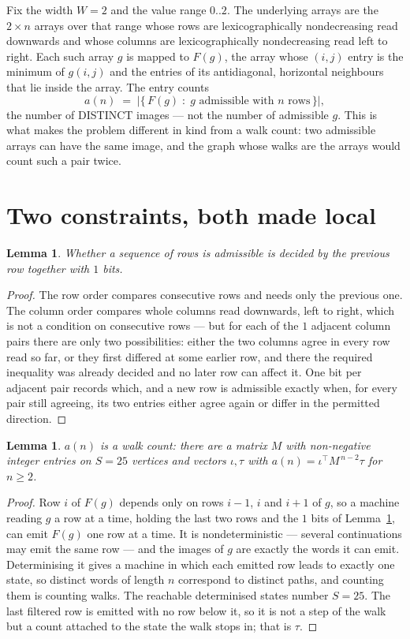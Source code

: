 \documentclass[11pt,a4paper]{article}
\theoremstyle{plain}
\newtheorem{lemma}[theorem]{Lemma}
\theoremstyle{definition}
\begin{document}
Fix the width $W=2$ and the value range $0..2$. The underlying arrays are the
$2\times n$ arrays over that range whose rows are lexicographically nondecreasing read downwards
and whose columns are lexicographically nondecreasing read left to right. Each such array $g$
is mapped to $F(g)$, the array whose $(i,j)$ entry is the minimum of $g(i,j)$ and the entries
of its antidiagonal, horizontal neighbours that lie inside the array. The entry counts
\[
a(n)\;=\;\bigl|\{\,F(g)\;:\;g\text{ admissible with }n\text{ rows}\,\}\bigr|,
\]
the number of DISTINCT images --- not the number of admissible $g$. This is what makes the
problem different in kind from a walk count: two admissible arrays can have the same image, and
the graph whose walks are the arrays would count such a pair twice.

\section{Two constraints, both made local}

\begin{lemma}\label{lem:local}
Whether a sequence of rows is admissible is decided by the previous row together with
$1$ bits.
\end{lemma}

\begin{proof}
The row order compares consecutive rows and needs only the previous one. The column order
compares whole columns read downwards, left to right, which is not a condition on consecutive
rows --- but for each of the $1$ adjacent column pairs there are only two possibilities:
either the two columns agree in every row read so far, or they first differed at some earlier
row, and there the required inequality was already decided and no later row can affect it. One
bit per adjacent pair records which, and a new row is admissible exactly when, for every pair
still agreeing, its two entries either agree again or differ in the permitted direction.
\end{proof}

\begin{lemma}\label{lem:det}
$a(n)$ is a walk count: there are a matrix $M$ with non-negative integer entries on $S=25$
vertices and vectors $\iota,\tau$ with $a(n)=\iota^{\!\top}M^{\,n-2}\tau$ for $n\ge2$.
\end{lemma}

\begin{proof}
Row $i$ of $F(g)$ depends only on rows $i-1$, $i$ and $i+1$ of $g$, so a machine reading $g$ a
row at a time, holding the last two rows and the $1$ bits of Lemma~\ref{lem:local}, can
emit $F(g)$ one row at a time. It is nondeterministic --- several continuations may emit the
same row --- and the images of $g$ are exactly the words it can emit. Determinising it gives a
machine in which each emitted row leads to exactly one state, so distinct words of length $n$
correspond to distinct paths, and counting them is counting walks. The reachable determinised
states number $S=25$. The last filtered row is emitted with no row below it, so it is not a
step of the walk but a count attached to the state the walk stops in; that is $\tau$.
\end{proof}
\end{document}
